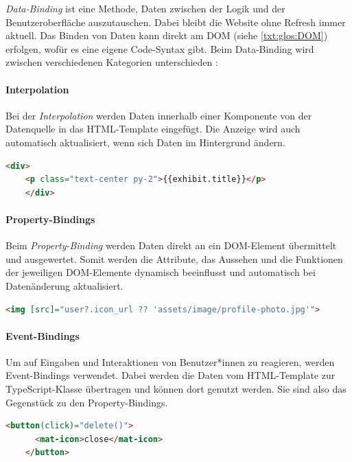 \emph{Data-Binding} ist eine Methode, Daten zwischen der Logik und der Benutzeroberfläche auszutauschen. Dabei bleibt die Website ohne Refresh immer aktuell. Das Binden von Daten kann direkt am DOM (siehe \ref{txt:glos:DOM}) erfolgen, wofür es eine eigene Code-Syntax gibt. Beim Data-Binding wird zwischen  verschiedenen Kategorien unterschieden \cite{AngularBuch} \cite{BindingSyntax}:  
    

\paragraph{Interpolation}
Bei der \emph{Interpolation} werden Daten innerhalb einer Komponente von der Datenquelle in das HTML-Template eingefügt. Die Anzeige wird auch automatisch aktualisiert, wenn sich Daten im Hintergrund ändern. \cite{BindingSyntax}

\begin{lstlisting}[caption={{Beispiel für Interpolation in der 3D-Gallery}},language=HTML,label=lst:impl:interpolation]
    <div>
    <p class="text-center py-2">{{exhibit.title}}</p>
    </div>
\end{lstlisting}

\paragraph{Property-Bindings}
Beim \emph{Property-Binding} werden Daten direkt an ein DOM-Element übermittelt und ausgewertet. Somit werden die Attribute, das Aussehen und die Funktionen der jeweiligen DOM-Elemente dynamisch beeinflusst und automatisch bei Datenänderung aktualisiert. \cite{AngularPropertyBinding}
\begin{lstlisting}[caption={{Beispiel für Property-Bindings in der 3D-Gallery}},language=HTML,label=lst:impl:property-binding]
    <img [src]="user?.icon_url ?? 'assets/image/profile-photo.jpg'">
\end{lstlisting}

\paragraph{Event-Bindings}
Um auf Eingaben und Interaktionen von Benutzer*innen zu reagieren, werden Event-Bindings verwendet. Dabei werden die Daten vom HTML-Template zur TypeScript-Klasse übertragen und können dort genutzt werden. Sie sind also das Gegenstück zu den Property-Bindings. \cite{AngularEventBinding}
\begin{lstlisting}[caption={{Beispiel für Event-Bindings in der 3D-Gallery}},language=HTML,label=lst:impl:event-binding]
    <button(click)="delete()">
      <mat-icon>close</mat-icon>
    </button>
\end{lstlisting}


